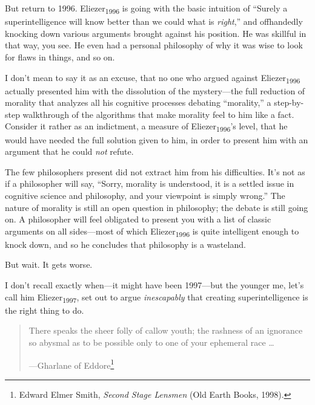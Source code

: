 {
 But return to 1996. Eliezer\textsubscript{1996} is going with the
basic intuition of ``Surely a superintelligence will
know better than we could what is \textit{right},''
and offhandedly knocking down various arguments brought against his
position. He was skillful in that way, you see. He even had a personal
philosophy of why it was wise to look for flaws in things, and so on.}

{
 I don't mean to say it as an excuse, that no one
who argued against Eliezer\textsubscript{1996} actually presented him
with the dissolution of the mystery---the full reduction of morality
that analyzes all his cognitive processes debating
``morality,'' a step-by-step
walkthrough of the algorithms that make morality feel to him like a
fact. Consider it rather as an indictment, a measure of
Eliezer\textsubscript{1996}'s level, that he would have
needed the full solution given to him, in order to present him with an
argument that he could \textit{not} refute.}

{
 The few philosophers present did not extract him from his
difficulties. It's not as if a philosopher will say,
``Sorry, morality is understood, it is a settled issue
in cognitive science and philosophy, and your viewpoint is simply
wrong.'' The nature of morality is still an open
question in philosophy; the debate is still going on. A philosopher
will feel obligated to present you with a list of classic arguments on
all sides---most of which Eliezer\textsubscript{1996} is quite
intelligent enough to knock down, and so he concludes that philosophy
is a wasteland.}

{
 But wait. It gets worse.}

{
 I don't recall exactly when---it might have been
1997---but the younger me, let's call him
Eliezer\textsubscript{1997}, set out to argue \textit{inescapably} that
creating superintelligence is the right thing to do.}

\myendsectiontext


\begin{quote}
{
 There speaks the sheer folly of callow youth; the rashness of an
ignorance so abysmal as to be possible only to one of your ephemeral
race \ldots}

{\raggedleft
 {}---Gharlane of Eddore\footnote{Edward Elmer Smith, \textit{Second Stage Lensmen} (Old Earth
Books, 1998).}
 \par}
\end{quote}


